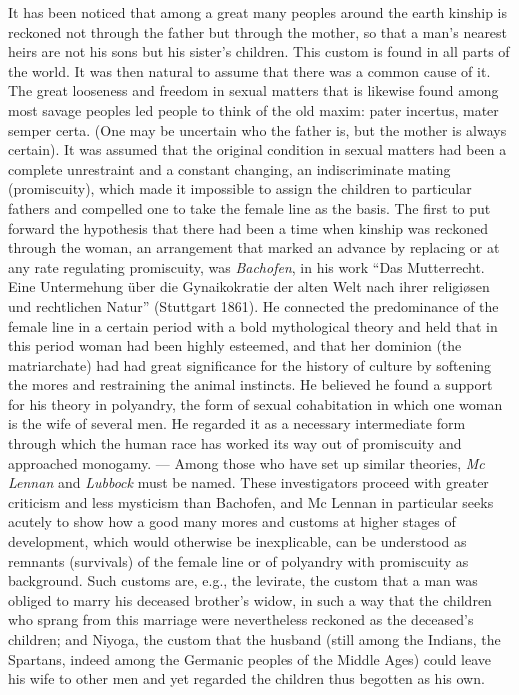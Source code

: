 \documentclass[12pt,a4paper,openany]{book}
\newcommand{\opage}[1]{\marginnote{\footnotesize\textit{[#1]}}}
\begin{document}
It has been noticed that among a great many peoples
around the earth kinship is reckoned not through the father
but through the mother, so that a man's nearest heirs
are not his sons but his sister's children. This custom is found in all
parts of the world. It was then natural to assume that there was a
common cause of it. The great looseness and freedom in sexual
matters that is likewise found among most savage peoples
led people to think of the old maxim: pater
incertus, mater semper certa. (One may be uncertain who
the father is, but the mother is always certain). It was assumed that the
original condition in sexual matters had been a complete
unrestraint and a constant changing, an indiscriminate mating
(promiscuity), which made it impossible to assign the children to
particular fathers and compelled one to take the female line as the basis.
\opage{789}The first to put forward the hypothesis that there had been a time
when kinship was reckoned through the woman, an arrangement that marked
an advance by replacing or at any rate regulating promiscuity,
was \emph{Bachofen}, in his work ``Das Mutterrecht. Eine
Untermehung über die Gynaikokratie der alten Welt nach ihrer
religiøsen und rechtlichen Natur'' (Stuttgart 1861). He connected
the predominance of the female line in a certain period with
a bold mythological theory and held that in this period woman
had been highly esteemed, and that her dominion (the matriarchate)
had had great significance for the history of culture by softening the mores
and restraining the animal instincts. He believed he found a support for his theory
in polyandry, the form of sexual cohabitation in which
one woman is the wife of several men. He regarded it as a necessary
intermediate form through which the human race has worked its way
out of promiscuity and approached monogamy. --- Among
those who have set up similar theories, \emph{Mc Lennan} and
\emph{Lubbock} must be named. These investigators proceed with greater criticism
and less mysticism than Bachofen, and Mc Lennan in particular seeks
acutely to show how a good many mores and customs
at higher stages of development, which would otherwise be inexplicable, can
be understood as remnants (survivals) of the female line or of polyandry with
promiscuity as background. Such customs are, e.g., the levirate,
the custom that a man was obliged to marry his deceased
brother's widow, in such a way that the children who sprang from this marriage
were nevertheless reckoned as the deceased's children; and Niyoga, the custom
that the husband (still among the Indians, the Spartans, indeed among the
Germanic peoples of the Middle Ages) could leave his wife to other men and yet
regarded the children thus begotten as his own.
\end{document}
